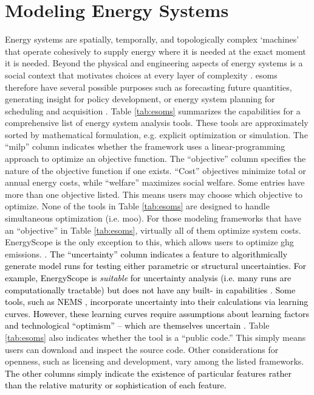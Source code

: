 \section{Modeling Energy Systems}

Energy systems are spatially, temporally, and topologically complex ‘machines’
that operate cohesively to supply energy where it is needed at the exact moment
it is needed. Beyond the physical and engineering aspects of energy systems is a 
social context that motivates choices at every layer of complexity 
\cite{dotson_influence_2022}. \Acfp{esom} therefore have several possible purposes 
such as forecasting future quantities, generating insight for policy development, or 
energy system planning for scheduling and acquisition \cite{decarolis_using_2011, 
yue_review_2018}. Table \ref{tab:esoms} summarizes the capabilities for a 
comprehensive list of energy system analysis tools. These tools are approximately 
sorted by mathematical formulation, e.g. explicit optimization or simulation. The 
``\ac{milp}'' column indicates whether the framework uses a linear-programming 
approach to optimize an objective function. The ``objective'' column specifies the 
nature of the objective function if one exists. ``Cost'' objectives minimize total or 
annual energy costs, while ``welfare'' maximizes social welfare. Some entries have more 
than one objective listed. This means users may choose which objective to optimize. 
None of the tools in Table \ref{tab:esoms} are designed to handle simultaneous 
optimization (i.e. \ac{moo}). For those modeling frameworks that have an ``objective'' in 
Table \ref{tab:esoms}, virtually all of them optimize system costs. EnergyScope is the 
only exception to this, which allows users to optimize \ac{ghg} emissions. 
\cite{limpens_energyscope_2019}. \textcolor{black}{The ``uncertainty'' column indicates 
a feature to algorithmically generate model runs for testing either parametric or 
structural uncertainties.  \textcolor{black}{For example, EnergyScope is \textit{suitable} for 
uncertainty analysis (i.e. many runs are computationally tractable) but does not have any built-
in capabilities \cite{limpens_energyscope_2019}.} Some tools, such as NEMS
\cite{nalley_national_2019}, incorporate uncertainty into their calculations via 
learning curves. However, these learning curves require assumptions about learning 
factors and technological ``optimism'' --  which are themselves uncertain
\cite{nalley_national_2019}.} Table \ref{tab:esoms} also indicates whether the tool is a 
``public code.'' This simply means users can download and inspect the source code. Other 
considerations for openness, such as licensing and development, vary among the listed 
frameworks. \textcolor{black}{The other columns simply indicate the existence of particular 
features rather than the relative maturity or sophistication of each feature.} 

